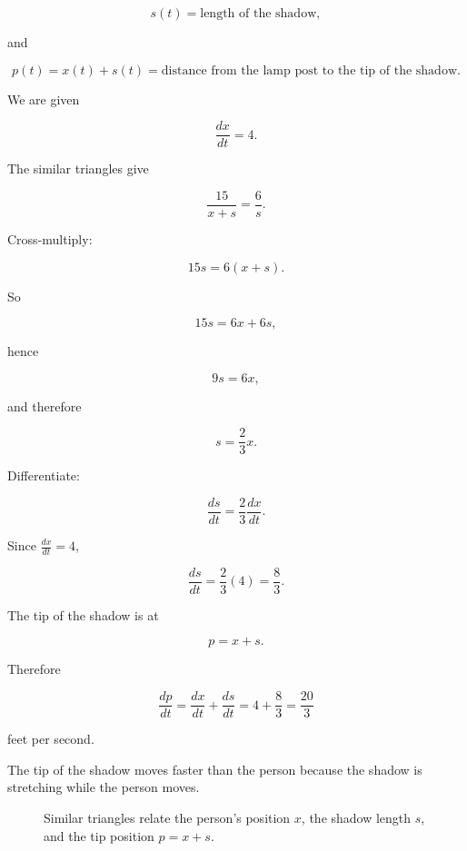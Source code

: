\[
s(t)=\text{length of the shadow},
\]

and

\[
p(t)=x(t)+s(t)=\text{distance from the lamp post to the tip of the shadow}.
\]

We are given

\[
\frac{dx}{dt}=4.
\]

The similar triangles give

\[
\frac{15}{x+s}=\frac{6}{s}.
\]

Cross-multiply:

\[
15s=6(x+s).
\]

So

\[
15s=6x+6s,
\]

hence

\[
9s=6x,
\]

and therefore

\[
s=\frac23x.
\]

Differentiate:

\[
\frac{ds}{dt}=\frac23\frac{dx}{dt}.
\]

Since \(\frac{dx}{dt}=4\),

\[
\frac{ds}{dt}=\frac23(4)=\frac83.
\]

The tip of the shadow is at

\[
p=x+s.
\]

Therefore

\[
\frac{dp}{dt}
=
\frac{dx}{dt}+\frac{ds}{dt}
=
4+\frac83
=
\boxed{\frac{20}{3}}
\]

feet per second.

The tip of the shadow moves faster than the person because the shadow is stretching
while the person moves.

\begin{figure}[h]
\centering
{}
\caption{Similar triangles relate the person's position \(x\), the shadow length \(s\), and the tip position \(p=x+s\).}
\label{fig:related-rates-shadow}
\end{figure}

